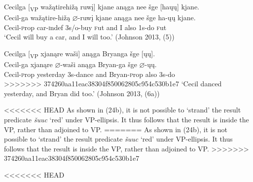 \documentclass[output=paper]{LSP/langsci}
\begin{document}
\begin{exe}
\begin{exe}
\begin{exe}
\begin{exe}
{\begin{exe}
\begin{exe}
\ex \glll Cecilga [\textsubscript{VP} wa\v{z}\k{a}tirehi\v{z}\k{a} ruw\k{i}] kjane an\k{a}ga nee \v{s}ge [ha\k{u}\k{u}] kjane.\\
Cecil-ga {} wa\v{z}\k{a}tire-hi\v{z}\k{a} $\varnothing$-ruw\k{i} kjane an\k{a}ga nee \v{s}ge ha-\k{u}\k{u} kjane.\\
Cecil-{\textsc prop} {} car-{\textsc indef} {\textsc 3s/o}-buy {\textsc fut} and I also {\textsc 1s}-do {\textsc fut}\\
\glt `Cecil will buy a car, and I will too.' (Johnson 2013, (5))

\ex \glll Cecilga [\textsubscript{VP} xjan\k{a}re wa\v{s}i] an\k{a}ga Bryanga \v{s}ge [\k{u}\k{u}].\\
Cecil-ga {} xjan\k{a}re $\varnothing$-wa\v{s}i an\k{a}ga Bryan-ga \v{s}ge $\varnothing$-\k{u}\k{u}.\\
Cecil-{\textsc prop} {} yesterday {\textsc 3s}-dance and Bryan-{\textsc prop} also {\textsc 3s}-do\\
>>>>>>> 374260aa11eac38304f850062805c954c530b1e7
\glt `Cecil danced yesterday, and Bryan did too.' (Johnson 2013, (6a))

\end{exe}

<<<<<<< HEAD
As shown in (24b), it is not possible to `strand' the result predicate \textit{šuuc} `red' under VP-ellipsis. It thus follows that the result is inside the VP, rather than adjoined to VP.
=======
As shown in (24b), it is not possible to `strand' the result predicate \textit{\v{s}uuc} `red' under VP-ellipsis. It thus follows that the result is inside the VP, rather than adjoined to VP.
>>>>>>> 374260aa11eac38304f850062805c954c530b1e7

\begin{exe}
\ex
\begin{xlist}

<<<<<<< HEAD


\end{xlist}
\end{exe}
\end{exe}}
\end{exe}
\end{exe}
\end{exe}
\end{exe}
\end{document}

